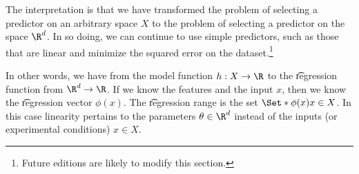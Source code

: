 The interpretation is that we have transformed the problem of selecting a predictor on an arbitrary space $X$ to the problem of selecting a predictor on the space $\R^d$.
In so doing, we can continue to use simple predictors, such as those that are linear and minimize the squared error on the dataset.\footnote{Future editions are likely to modify this section.}

In other words, we have  from the model function $h: X \to \R$ to the \t{regression function} from $\R^d \to \R$.
If we know the features and the input $x$, then we know the \t{regression vector} $\phi(x)$.
The \t{regression range} is the set $\Set*{\phi(x)}{x \in X}$.
In this case linearity pertains to the parameters $\theta \in \R^d$ instead of the inputs (or experimental conditions) $x \in X$.